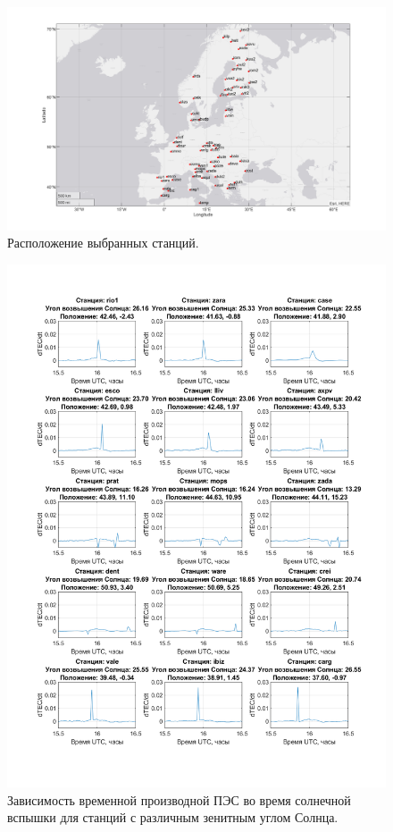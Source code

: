 \documentclass[a4paper]{article}
\begin{document}
\begin{landscape}
\begin{figure}[h!]
\centering
\includegraphics[width = 1\linewidth]{pics/clean_pics/stations.png}
\caption{Расположение выбранных станций.}
\label{stations}
\end{figure}
\end{landscape}




\begin{figure}[h!]
\centering
\includegraphics[width = 1\linewidth]{pics/clean_pics/dtec15.png}
\caption{Зависимость временной производной ПЭС во время солнечной вспышки для станций с различным зенитным углом Солнца.}
\label{dtec15}
\end{figure}
\end{document}
